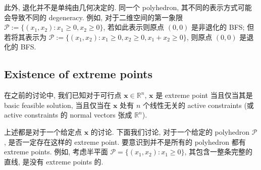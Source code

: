 \documentclass[11pt,UTF8,scheme=plain,fontset=fandol,linespread=1.3]{ctexart}
\numberwithin{figure}{section}
\begin{document}
此外, 退化并不是单纯由几何决定的. 同一个 polyhedron, 其不同的表示方式可能会导致不同的 degeneracy. 例如, 对于二维空间的第一象限 $\mathcal{P} := \{(x_1, x_2): x_1 \geq 0, x_2 \geq 0\}$, 若如此表示则原点 $(0, 0)$ 是非退化的 BFS; 但若将其表示为 $\mathcal{P} := \{(x_1, x_2): x_1 \geq 0, x_2 \geq 0, x_1 + x_2 \geq 0\}$, 则原点 $(0, 0)$ 是退化的 BFS.

\subsection{Existence of extreme points}

在之前的讨论中, 我们已知对于可行点 $\bm{x} \in \mathbb{R}^n$, $\bm{x}$ 是 extreme point 当且仅当其是 basic feasible solution, 当且仅当在 $\bm{x}$ 处有 $n$ 个线性无关的 active constraints (或 active constraints 的 normal vectors 张成 $\mathbb{R}^n$).

上述都是对于一个给定点 $\bm{x}$ 的讨论. 下面我们讨论, 对于一个给定的 polyhedron $\mathcal{P}$, 是否一定存在这样的 extreme point. 要意识到并不是所有的 polyhedron 都有 extreme points. 例如, 考虑半平面 $\mathcal{P} = \{(x_1, x_2): x_1 \geq 0\}$, 其包含一整条完整的直线, 是没有 extreme points 的.
\end{document}
